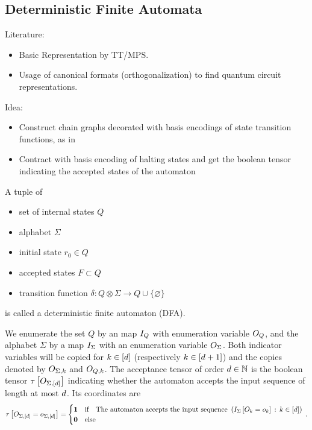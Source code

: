 \subsection{Deterministic Finite Automata}

Literature:
\begin{itemize}
    \item \cite{crosswhite_finite_2008} Basic Representation by TT/MPS.
    \item \cite{bellante_compiling_2026} Usage of canonical formats (orthogonalization) to find quantum circuit representations.
\end{itemize}

Idea:
\begin{itemize}
    \item Construct chain graphs decorated with basis encodings of state transition functions, as in \cite{crosswhite_finite_2008,bellante_compiling_2026}
    \item Contract with basis encoding of halting states and get the boolean tensor indicating the accepted states of the automaton
\end{itemize}

\begin{definition}
    A tuple of
    \begin{itemize}
        \item set of internal states $Q$
        \item alphabet $\Sigma$
        \item initial state $r_0\in Q$
        \item accepted states $F\subset Q$
        \item transition function $\delta:Q\otimes \Sigma\rightarrow Q\cup\{\varnothing\}$
    \end{itemize}
    is called a deterministic finite automaton (DFA).
\end{definition}

We enumerate the set $Q$ by an map $I_{Q}$ with enumeration variable $O_{Q}$, and the alphabet $\Sigma$ by a map $I_{\Sigma}$ with an enumeration variable $O_{\Sigma}$.
Both indicator variables will be copied for $k\in[d]$ (respectively $k\in[d+1]$) and the copies denoted by $O_{\Sigma,k}$ and $O_{Q,k}$.
The acceptance tensor of order $d\in\mathbb{N}$ is the boolean tensor $\tau\left[O_{\Sigma,[d]}\right]$ indicating whether the automaton accepts the input sequence of length at most $d$.
Its coordinates are
\begin{align*}
    \tau\left[O_{\Sigma,[d]}=o_{\Sigma,[d]}\right]
    = \begin{cases}
          \mathbf{1} & \text{if}\quad \text{The automaton accepts the input sequence }\left(I_{\Sigma}\left[O_{k}=o_{k}\right]\,:\,k\in[d]\right)\\
          \mathbf{0} & \text{else}
    \end{cases} \, .
\end{align*}


